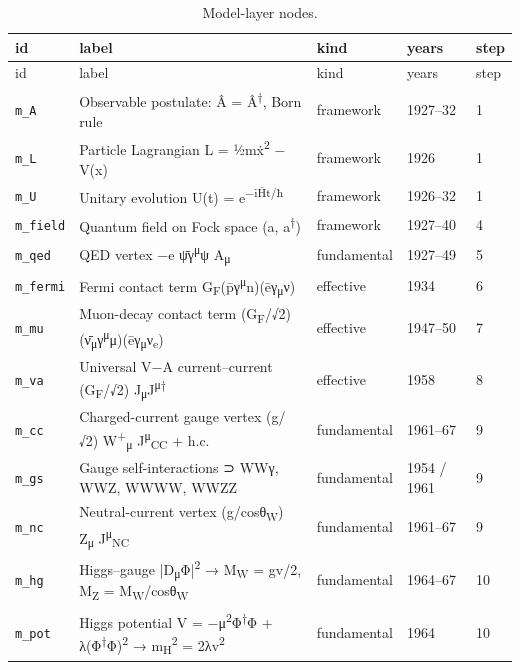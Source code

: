 \begin{longtable}{@{}l>{\raggedright\arraybackslash}p{7.6cm}lll@{}}
\caption{Model-layer nodes.}\label{tab:nodesM}\\
\toprule id & label & kind & years & step\\\midrule\endfirsthead
\toprule id & label & kind & years & step\\\midrule\endhead
\bottomrule\endfoot
\texttt{m\_A} & Observable postulate: Â = Â\textsuperscript{†}, Born rule & framework & 1927–32 & 1\\
\texttt{m\_L} & Particle Lagrangian L = ½mẋ\textsuperscript{2} − V(x) & framework & 1926 & 1\\
\texttt{m\_U} & Unitary evolution U(t) = e\textsuperscript{−iĤt/ħ} & framework & 1926–32 & 1\\
\texttt{m\_field} & Quantum field on Fock space (a, a\textsuperscript{†}) & framework & 1927–40 & 4\\
\texttt{m\_qed} & QED vertex −e ψ̄γ\textsuperscript{μ}ψ A\textsubscript{μ} & fundamental & 1927–49 & 5\\
\texttt{m\_fermi} & Fermi contact term G\textsubscript{F}(p̄γ\textsuperscript{μ}n)(ēγ\textsubscript{μ}ν) & effective & 1934 & 6\\
\texttt{m\_mu} & Muon-decay contact term (G\textsubscript{F}/√2)(ν̄\textsubscript{μ}γ\textsuperscript{μ}μ)(ēγ\textsubscript{μ}ν\textsubscript{e}) & effective & 1947–50 & 7\\
\texttt{m\_va} & Universal V−A current–current (G\textsubscript{F}/√2) J\textsubscript{μ}J\textsuperscript{μ†} & effective & 1958 & 8\\
\texttt{m\_cc} & Charged-current gauge vertex (g/√2) W\textsuperscript{+}\textsubscript{μ} J\textsuperscript{μ}\textsubscript{CC} + h.c. & fundamental & 1961–67 & 9\\
\texttt{m\_gs} & Gauge self-interactions ⊃ WWγ, WWZ, WWWW, WWZZ & fundamental & 1954 / 1961 & 9\\
\texttt{m\_nc} & Neutral-current vertex (g/cosθ\textsubscript{W}) Z\textsubscript{μ} J\textsuperscript{μ}\textsubscript{NC} & fundamental & 1961–67 & 9\\
\texttt{m\_hg} & Higgs–gauge |D\textsubscript{μ}Φ|\textsuperscript{2} → M\textsubscript{W} = gv/2, M\textsubscript{Z} = M\textsubscript{W}/cosθ\textsubscript{W} & fundamental & 1964–67 & 10\\
\texttt{m\_pot} & Higgs potential V = −μ\textsuperscript{2}Φ\textsuperscript{†}Φ + λ(Φ\textsuperscript{†}Φ)\textsuperscript{2} → m\textsubscript{H}\textsuperscript{2} = 2λv\textsuperscript{2} & fundamental & 1964 & 10\\

\end{longtable}
